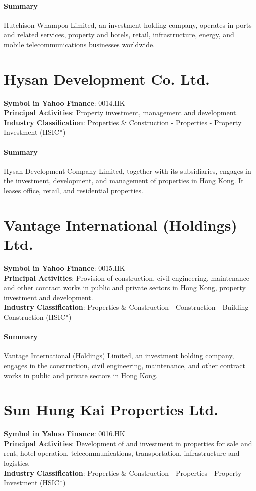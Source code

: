 \paragraph{Summary}
Hutchison Whampoa Limited, an investment holding company, operates in ports and related services, property and hotels, retail, infrastructure, energy, and mobile telecommunications businesses worldwide.


\section{Hysan Development Co. Ltd.}
\textbf{Symbol in Yahoo Finance}: 0014.HK\\
\textbf{Principal Activities}: Property investment, management and development.\\
\textbf{Industry Classification}: Properties \& Construction - Properties - Property Investment (HSIC*)
\paragraph{Summary}
Hysan Development Company Limited, together with its subsidiaries, engages in the investment, development, and management of properties in Hong Kong. It leases office, retail, and residential properties.


\section{Vantage International (Holdings) Ltd.}
\textbf{Symbol in Yahoo Finance}: 0015.HK\\
\textbf{Principal Activities}: Provision of construction, civil engineering, maintenance and other contract works in public and private sectors in Hong Kong, property investment and development.\\
\textbf{Industry Classification}: Properties \& Construction - Construction - Building Construction (HSIC*)
\paragraph{Summary}
Vantage International (Holdings) Limited, an investment holding company, engages in the construction, civil engineering, maintenance, and other contract works in public and private sectors in Hong Kong.


\section{Sun Hung Kai Properties Ltd.}
\textbf{Symbol in Yahoo Finance}: 0016.HK\\
\textbf{Principal Activities}: Development of and investment in properties for sale and rent, hotel operation, telecommunications, transportation, infrastructure and logistics.\\
\textbf{Industry Classification}: Properties \& Construction - Properties - Property Investment (HSIC*)
